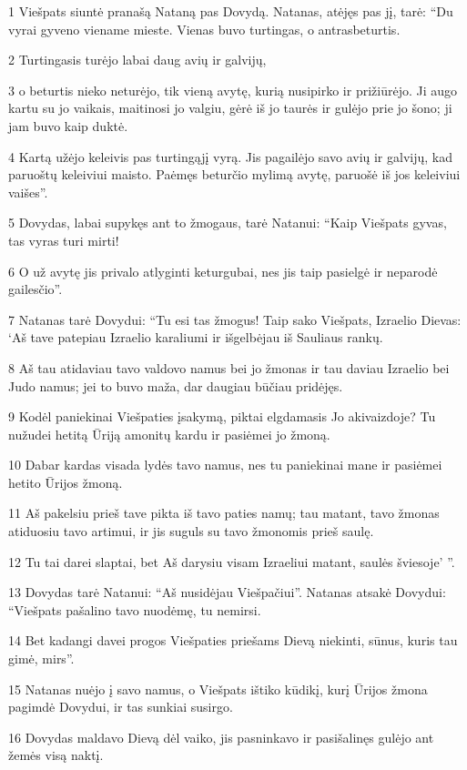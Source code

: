 \par 1 Viešpats siuntė pranašą Nataną pas Dovydą. Natanas, atėjęs pas jį, tarė: “Du vyrai gyveno viename mieste. Vienas buvo turtingas, o antras­beturtis. 
\par 2 Turtingasis turėjo labai daug avių ir galvijų, 
\par 3 o beturtis nieko neturėjo, tik vieną avytę, kurią nusipirko ir prižiūrėjo. Ji augo kartu su jo vaikais, maitinosi jo valgiu, gėrė iš jo taurės ir gulėjo prie jo šono; ji jam buvo kaip duktė. 
\par 4 Kartą užėjo keleivis pas turtingąjį vyrą. Jis pagailėjo savo avių ir galvijų, kad paruoštų keleiviui maisto. Paėmęs beturčio mylimą avytę, paruošė iš jos keleiviui vaišes”. 
\par 5 Dovydas, labai supykęs ant to žmogaus, tarė Natanui: “Kaip Viešpats gyvas, tas vyras turi mirti! 
\par 6 O už avytę jis privalo atlyginti keturgubai, nes jis taip pasielgė ir neparodė gailesčio”. 
\par 7 Natanas tarė Dovydui: “Tu esi tas žmogus! Taip sako Viešpats, Izraelio Dievas: ‘Aš tave patepiau Izraelio karaliumi ir išgelbėjau iš Sauliaus rankų. 
\par 8 Aš tau atidaviau tavo valdovo namus bei jo žmonas ir tau daviau Izraelio bei Judo namus; jei to buvo maža, dar daugiau būčiau pridėjęs. 
\par 9 Kodėl paniekinai Viešpaties įsakymą, piktai elgdamasis Jo akivaizdoje? Tu nužudei hetitą Ūriją amonitų kardu ir pasiėmei jo žmoną. 
\par 10 Dabar kardas visada lydės tavo namus, nes tu paniekinai mane ir pasiėmei hetito Ūrijos žmoną. 
\par 11 Aš pakelsiu prieš tave pikta iš tavo paties namų; tau matant, tavo žmonas atiduosiu tavo artimui, ir jis suguls su tavo žmonomis prieš saulę. 
\par 12 Tu tai darei slaptai, bet Aš darysiu visam Izraeliui matant, saulės šviesoje’ ”. 
\par 13 Dovydas tarė Natanui: “Aš nusidėjau Viešpačiui”. Natanas atsakė Dovydui: “Viešpats pašalino tavo nuodėmę, tu nemirsi. 
\par 14 Bet kadangi davei progos Viešpaties priešams Dievą niekinti, sūnus, kuris tau gimė, mirs”. 
\par 15 Natanas nuėjo į savo namus, o Viešpats ištiko kūdikį, kurį Ūrijos žmona pagimdė Dovydui, ir tas sunkiai susirgo. 
\par 16 Dovydas maldavo Dievą dėl vaiko, jis pasninkavo ir pasišalinęs gulėjo ant žemės visą naktį. 
